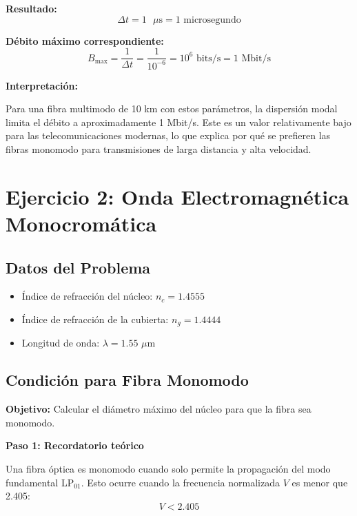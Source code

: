 \documentclass[11pt,a4paper]{article}
\begin{document}
\textbf{Resultado:}
\begin{equation}
    \Delta t = 1 \text{ }\mu\text{s} = 1 \text{ microsegundo}
\end{equation}

\textbf{Débito máximo correspondiente:}
\begin{equation}
    B_{\max} = \frac{1}{\Delta t} = \frac{1}{10^{-6}} = 10^6 \text{ bits/s} = 1 \text{ Mbit/s}
\end{equation}

\textbf{Interpretación:}

Para una fibra multimodo de 10 km con estos parámetros, la dispersión modal limita el débito a aproximadamente 1 Mbit/s. Este es un valor relativamente bajo para las telecomunicaciones modernas, lo que explica por qué se prefieren las fibras monomodo para transmisiones de larga distancia y alta velocidad.

\section{Ejercicio 2: Onda Electromagnética Monocromática}

\subsection{Datos del Problema}

\begin{itemize}
    \item Índice de refracción del núcleo: $n_c = 1.4555$
    \item Índice de refracción de la cubierta: $n_g = 1.4444$
    \item Longitud de onda: $\lambda = 1.55$ $\mu$m
\end{itemize}

\subsection{Condición para Fibra Monomodo}

\textbf{Objetivo:} Calcular el diámetro máximo del núcleo para que la fibra sea monomodo.

\textbf{Paso 1: Recordatorio teórico}

Una fibra óptica es monomodo cuando solo permite la propagación del modo fundamental LP$_{01}$. Esto ocurre cuando la frecuencia normalizada $V$ es menor que 2.405:
\begin{equation}
    V < 2.405
\end{equation}
\end{document}
